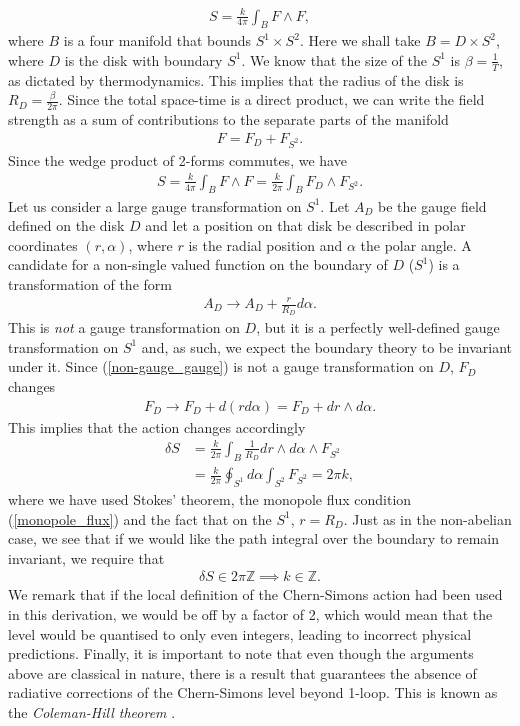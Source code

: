\begin{align}
    S=\frac{k}{4 \pi} \int_{B} F\wedge F,
\end{align}
 where $B$ is a four manifold that bounds $S^1 \times S^2$. Here we shall take $B= D\times S^2$, where $D$ is the disk with boundary $S^1$. We know that the size of the $S^1$ is $\beta= \frac{1}{T}$, as dictated by thermodynamics. This implies that the radius of the disk is $R_D=\frac{\beta}{2\pi}$. Since the total space-time is a direct product, we can write the field strength as a sum of contributions to the separate parts of the manifold 
\begin{align}
    F= F_D +F_{S^2}.
\end{align}
 Since the wedge product of 2-forms commutes, we have 
\begin{align}
       S = \frac{k}{4\pi}\int_B F\wedge F = \frac{k}{2\pi} \int_B F_{D} \wedge F_{S^2}.
\end{align}
Let us consider a large gauge transformation on $S^1$. Let $A_D$ be the gauge field defined on the disk $D$ and let a position on that disk be described in polar coordinates $(r, \alpha)$, where $r$ is the radial position and $\alpha$ the polar angle. A candidate for a non-single valued function on the boundary of $D$ ($S^1$) is a transformation of the form 
\begin{align}
    A_D \rightarrow A_D + \frac{r}{R_D} d\alpha. \label{non-gauge_gauge}
\end{align}
This is \textit{not} a gauge transformation on $D$, but it is a perfectly well-defined gauge transformation on $S^1$ and, as such, we expect the boundary theory to be invariant under it. Since (\ref{non-gauge_gauge}) is not a gauge transformation on $D$, $F_D$ changes
\begin{align}
    F_D \rightarrow F_D + d (r d\alpha) =F_D + dr \wedge d\alpha.
\end{align}
 This implies that the action changes accordingly 
\begin{align}
    \delta S & = \frac{k}{2\pi} \int_B \frac{1}{R_D} dr \wedge d\alpha \wedge F_{S^2}\\
    & = \frac{k}{2\pi} \oint_{S^1}  d\alpha \int_{S^2} F_{S^2}=2\pi k,
\end{align}
 where we have used Stokes' theorem, the monopole flux condition (\ref{monopole_flux}) and the fact that on the $S^1$, $r=R_D$. Just as in the non-abelian case, we see that if we would like the path integral over the boundary to remain invariant, we require that 
\begin{align}
    \delta S \in 2\pi \mathbb{Z} \implies k\in \mathbb{Z}.
\end{align}
We remark that if the local definition of the Chern-Simons action had been used in this derivation, we would be off by a factor of 2, which would mean that the level would be quantised to only even integers, leading to incorrect physical predictions. Finally, it is important to note that even though the arguments above are classical in nature, there is a result that guarantees the absence of radiative corrections of the Chern-Simons level beyond 1-loop. This is known as the \textit{Coleman-Hill theorem} \cite{Coleman:1985zi, Khare:1994yv}.  
